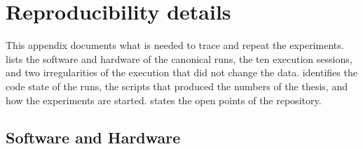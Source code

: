 \chapter{Reproducibility details}
\label{app:reproducibility}

This appendix documents what is needed to trace and repeat the experiments.
 lists the software and hardware of the canonical runs,  the ten execution sessions, and  two irregularities of the execution that did not change the data.
 identifies the code state of the runs,  the scripts that produced the numbers of the thesis, and  how the experiments are started.
 states the open points of the repository.

\section{Software and Hardware}\label{sec:app-repro-env}

